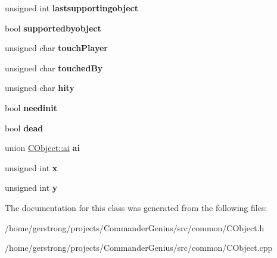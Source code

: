 \begin{DoxyCompactItemize}
\item 
\hypertarget{class_c_object_a1cb90cf351c0c94b383d0eac69300bb8}{
unsigned int {\bfseries lastsupportingobject}}
\label{class_c_object_a1cb90cf351c0c94b383d0eac69300bb8}

\item 
\hypertarget{class_c_object_ad853de77663b9dabe9746f54b29e3e99}{
bool {\bfseries supportedbyobject}}
\label{class_c_object_ad853de77663b9dabe9746f54b29e3e99}

\item 
\hypertarget{class_c_object_ada4337bd235f886a2750a42e8a3d23e3}{
unsigned char {\bfseries touchPlayer}}
\label{class_c_object_ada4337bd235f886a2750a42e8a3d23e3}

\item 
\hypertarget{class_c_object_a2c659f241e2c25a5dc8380a34e9bf077}{
unsigned char {\bfseries touchedBy}}
\label{class_c_object_a2c659f241e2c25a5dc8380a34e9bf077}

\item 
\hypertarget{class_c_object_a724963c226ced413249d0bc1f911a117}{
unsigned char {\bfseries hity}}
\label{class_c_object_a724963c226ced413249d0bc1f911a117}

\item 
\hypertarget{class_c_object_a4aa1a1c350c14a8cc1d8b7f844a1a33f}{
bool {\bfseries needinit}}
\label{class_c_object_a4aa1a1c350c14a8cc1d8b7f844a1a33f}

\item 
\hypertarget{class_c_object_ac3af9e59095d1bfd0be1c28a3193052c}{
bool {\bfseries dead}}
\label{class_c_object_ac3af9e59095d1bfd0be1c28a3193052c}

\item 
\hypertarget{class_c_object_a4c1bbd84232d380c1320ea1c0995d64b}{
union \hyperlink{union_c_object_1_1ai}{CObject::ai} {\bfseries ai}}
\label{class_c_object_a4c1bbd84232d380c1320ea1c0995d64b}

\item 
\hypertarget{class_c_object_ad9e2f1fb1c2f791a89f4b908e99de89f}{
unsigned int {\bfseries x}}
\label{class_c_object_ad9e2f1fb1c2f791a89f4b908e99de89f}

\item 
\hypertarget{class_c_object_a115e0dbc3a44b48295dd803badace73b}{
unsigned int {\bfseries y}}
\label{class_c_object_a115e0dbc3a44b48295dd803badace73b}

\end{DoxyCompactItemize}


The documentation for this class was generated from the following files:\begin{DoxyCompactItemize}
\item 
/home/gerstrong/projects/CommanderGenius/src/common/CObject.h\item 
/home/gerstrong/projects/CommanderGenius/src/common/CObject.cpp\end{DoxyCompactItemize}
